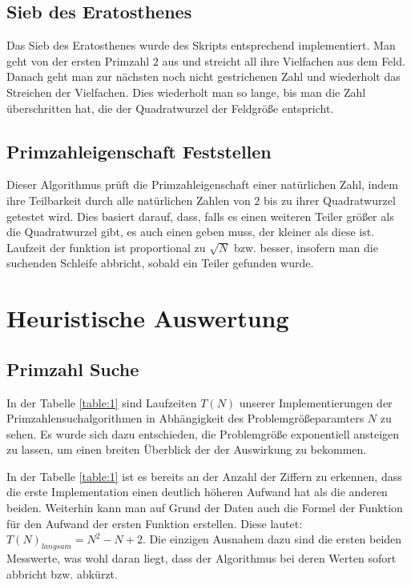 \documentclass[paper=a4, fontsize=11pt]{scrartcl} %
\numberwithin{equation}{section} %
\numberwithin{figure}{section} %
\numberwithin{table}{section} %
\begin{document}
\subsection{Sieb des Eratosthenes}\label{secEras}
Das Sieb des Eratosthenes wurde des Skripts entsprechend implementiert. Man geht
von der ersten Primzahl $2$ aus und streicht all ihre Vielfachen aus dem Feld. Danach
geht man zur n\"achsten noch nicht gestrichenen Zahl und wiederholt das Streichen der
Vielfachen. Dies wiederholt man so lange, bis man die Zahl \"uberschritten hat, die
der Quadratwurzel der Feldgr\"o{\ss}e entspricht.

\subsection{Primzahleigenschaft Feststellen}\label{secCheck}
Dieser Algorithmus pr\"uft die Primzahleigenschaft einer nat\"urlichen Zahl, indem
ihre Teilbarkeit durch alle nat\"urlichen Zahlen von $2$ bis zu ihrer Quadratwurzel
getestet wird. Dies basiert darauf, dass, falls es einen
weiteren Teiler gr\"o{\ss}er als die Quadratwurzel gibt, es auch einen geben muss,
der kleiner als diese ist. Laufzeit der funktion ist proportional zu $\sqrt{N}$ bzw.
besser, insofern man die suchenden Schleife abbricht, sobald ein Teiler gefunden wurde.


\section{Heuristische Auswertung}

\subsection{Primzahl Suche}

In der Tabelle \ref{table:1} sind Laufzeiten $T(N)$ unserer Implementierungen der
Primzahlensuchalgorithmen in Abh\"angigkeit des Problemgr\"o{\ss}eparamters $N$
zu sehen. Es wurde sich dazu entschieden, die Problemgr\"o{\ss}e exponentiell
ansteigen zu lassen, um einen breiten \"Uberblick der der Auswirkung zu bekommen.

In der Tabelle \ref{table:1} ist es bereits an  der Anzahl der Ziffern zu erkennen,
dass die erste Implementation einen deutlich h\"oheren Aufwand hat als die anderen
beiden. Weiterhin kann man auf Grund der Daten auch die Formel der Funktion f\"ur
den Aufwand der ersten Funktion erstellen. Diese lautet: $T(N)_{langsam} = N^2 -N +2$.
Die einzigen Ausnahem dazu sind die ersten beiden Messwerte, was wohl daran liegt,
dass der Algorithmus bei deren Werten sofort abbricht bzw. abk\"urzt.
\end{document}
